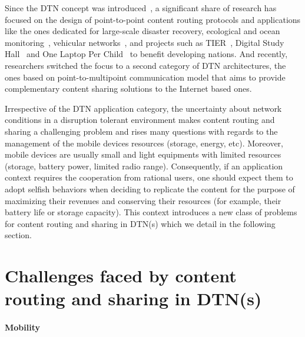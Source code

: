 Since the DTN concept was introduced~\cite{dtnrg}, a significant share of research has focused on the design of point-to-point content routing protocols and applications like the ones dedicated for large-scale disaster recovery, ecological and ocean monitoring~\cite{Juang:zebranet, Heidemann:Acoustic}, vehicular networks~\cite{Levine:MaxProp}, and projects such as TIER~\cite{TIER}, Digital Study Hall~\cite{DSH} and One Laptop Per Child~\cite{OneLaptopPerChild} to benefit developing nations. And recently, researchers switched the focus to a second category of DTN architectures, the ones based on point-to-multipoint communication model that aims to provide complementary content sharing solutions to the Internet based ones. 

Irrespective of the DTN application category, the uncertainty about network conditions in a disruption tolerant environment makes content routing and sharing a challenging problem and rises many questions with regards to the management of the mobile devices resources (storage, energy, etc). Moreover, mobile devices are usually small and light equipments with limited resources (storage, battery power, limited radio range). Consequently, if an application context requires the cooperation from rational users, one should expect them to adopt selfish behaviors when deciding to replicate the content for the purpose of maximizing their revenues and conserving their resources (for example, their battery life or storage capacity). This context introduces a new class of problems for content routing and sharing in DTN(s) which we detail in the following section.

\section{Challenges faced by content routing and sharing in DTN(s)}

\paragraph{Mobility}

